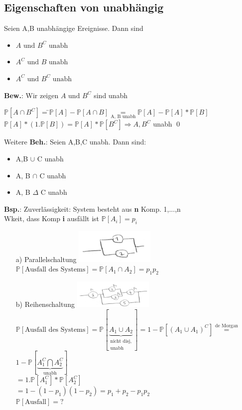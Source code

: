 \subsection{Eigenschaften von unabhängig}
Seien A,B unabhängige Ereignisse. Dann sind
\begin{itemize}
	\item $A \text{ und } B^C \text{ unabh}$
	\item $A^C \text{ und } B \text{ unabh}$
	\item $A^C \text{ und } B^C \text{ unabh}$
\end{itemize}
\textbf{Bew.}: Wir zeigen $A \text{ und } B^C$ sind unabh
\begin{tabbing}
	$\mathds{P}[A\cap B^C] =$\=$ \mathds{P}[A]-\mathds{P}[A\cap B]\underset{\text{A, B unabh}}{=}\mathds{P}[A] - \mathds{P}[A]*\mathds{P}[B]$\\
	\>$\mathds{P}[A]*(1.\mathds{P}[B])=\mathds{P}[A]*\mathds{P}[B^C] \Rightarrow A, B^C $ unabh \qed
\end{tabbing}
Weitere \textbf{Beh.}: Seien A,B,C unabh. Dann sind:
\begin{itemize}
	\item A,B $\cup$ C unabh 
	\item A, B $\cap$ C unabh
	\item A, B $\Delta$ C unabh
\end{itemize}
\textbf{Bsp.}: Zuverlässigkeit: System besteht aus \textbf{n} Komp. 1,...,n\\
Wkeit, dass Komp \textbf{i} ausfällt ist $\mathds{P}[A_i]=p_i$
\begin{enumerate}
	\item [a)] Parallelschaltung \includegraphics[width=0.3\textwidth]{img/parallel.PNG} \\
	$\mathds{P}[\text{Ausfall des Systems}] = \mathds{P}[A_1\cap A_2] = p_1p_2$
	\item [b)] Reihenschaltung \includegraphics[width=0.3\textwidth]{img/reihe.PNG}\\
	$\mathds{P}[\text{Ausfall des Systems}]= \mathds{P}[\underbrace{A_1 \cup A_2}_{\substack{\text{nicht disj,}\\\text{unabh}}}] = 1-\mathds{P}[(A_1 \cup A_1)^C]\overset{\text{de Morgan}}{=}$\smallskip\\
	$1-\mathds{P}[\underbrace{A_1^C \bigcap A_2^C}_\text{unabh}]$\smallskip\\
	$=1.\mathds{P}[A_1^C]*\mathds{P}[A_2^C]$\smallskip\\
	$=1-(1-p_1)(1-p_2)=p_1+p_2 - p_1p_2$\medskip\\

	$\mathds{P}[\text{Ausfall}] = ? $
\end{enumerate}

